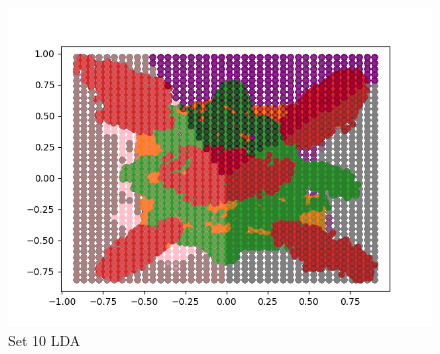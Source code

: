 \documentclass{article}
\begin{document}
\begin{figure}[H]
\begin{minipage}{.33\textwidth}
			\includegraphics[width=1\linewidth]{../set10LDAdecisions.png}
			\caption{Set 10 LDA}
	\end{minipage}\hfill
\end{figure}
\end{document}
